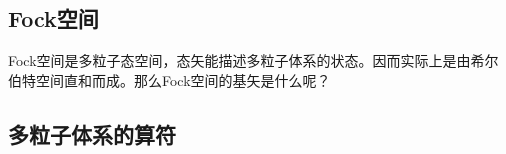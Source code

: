 \subsection{Fock空间}
Fock空间是多粒子态空间，态矢能描述多粒子体系的状态。因而实际上是由希尔伯特空间直和而成。那么Fock空间的基矢是什么呢？


\subsection{多粒子体系的算符}


